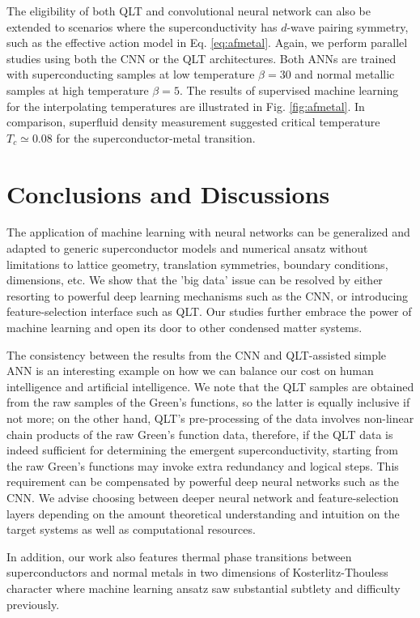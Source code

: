 \documentclass[amsmath,amssymb, aps, prl, twocolumn]{revtex4-1}
\begin{document}
The eligibility of both QLT and convolutional neural network can also be extended to scenarios where the superconductivity has $d$-wave pairing symmetry, such as the effective action model in Eq. \ref{eq:afmetal}. Again, we perform parallel studies using both the CNN or the QLT architectures. Both ANNs are trained with superconducting samples at low temperature $\beta=30$ and normal metallic samples at high temperature $\beta=5$. The results of supervised machine learning for the interpolating temperatures are illustrated in Fig. \ref{fig:afmetal}. In comparison, superfluid density measurement suggested critical temperature $T_c\simeq 0.08$ for the superconductor-metal transition\cite{Erez2016}.

\section{Conclusions and Discussions} The application of machine learning with neural networks can be generalized and adapted to generic superconductor models and numerical ansatz without limitations to lattice geometry, translation symmetries, boundary conditions, dimensions, etc. We show that the 'big data' issue can be resolved by either resorting to powerful deep learning mechanisms such as the CNN, or introducing feature-selection interface such as QLT. Our studies further embrace the power of machine learning and open its door to other condensed matter systems.

The consistency between the results from the CNN and QLT-assisted simple ANN is an interesting example on how we can balance our cost on human intelligence and artificial intelligence. We note that the QLT samples are obtained from the raw samples of the Green's functions, so the latter is equally inclusive if not more; on the other hand, QLT's pre-processing of the data involves non-linear chain products of the raw Green's function data, therefore, if the QLT data is indeed sufficient for determining the emergent superconductivity, starting from the raw Green's functions may invoke extra redundancy and logical steps. This requirement can be compensated by powerful deep neural networks such as the CNN. We advise choosing between deeper neural network and feature-selection layers depending on the amount theoretical understanding and intuition on the target systems as well as computational resources. 

In addition, our work also features thermal phase transitions between superconductors and normal metals in two dimensions of Kosterlitz-Thouless character where machine learning ansatz saw substantial subtlety and difficulty previously\cite{Anna2018}. 
\end{document}
